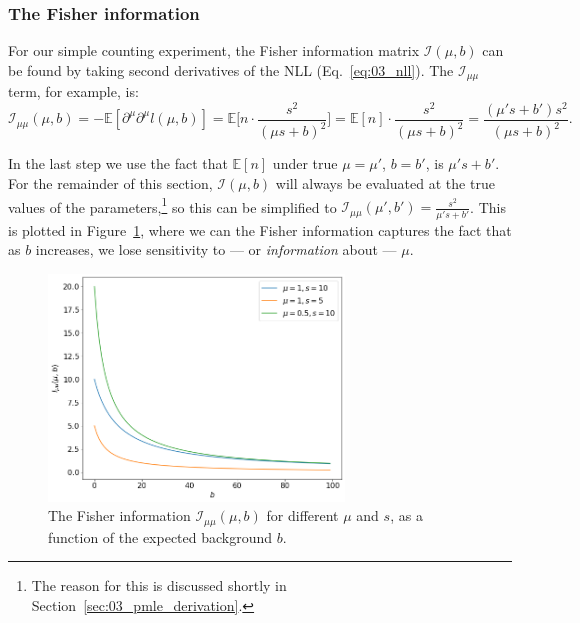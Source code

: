 \subsubsection{The Fisher information}

For our simple counting experiment, the Fisher information matrix $\mathcal I(\mu, b)$ can be found by taking second derivatives of the NLL (Eq.~\ref{eq:03_nll}).
The $\mathcal I_{\mu\mu}$ term, for example, is:
\begin{equation}
    \mathcal I_{\mu\mu}(\mu, b) = - \mathbb E[\partial^\mu\partial^\mu l(\mu, b)] = \mathbb E \bigg[n \cdot \frac{s^2}{(\mu s + b)^2}\bigg] = \mathbb E[n] \cdot \frac{s^2}{(\mu s + b)^2} = \frac{(\mu' s + b') s^2}{(\mu s + b)^2}.
\label{eq:03_fisher}
\end{equation}

In the last step we use the fact that $\mathbb E[n]$ under true $\mu = \mu'$, $b = b'$, is $\mu' s + b'$.
For the remainder of this section, $\mathcal I(\mu, b)$ will always be evaluated at the true values of the parameters,\footnote{The reason for this is discussed shortly in Section~\ref{sec:03_pmle_derivation}.} so this can be simplified to $\mathcal I_{\mu\mu}(\mu', b') = \frac{s^2}{\mu' s + b'}$.
This is plotted in Figure~\ref{fig:03_fisher}, where we can the Fisher information captures the fact that as $b$ increases, we lose sensitivity to --- or \textit{information} about --- $\mu$.

\begin{figure}[htb]
\centering
\includegraphics[width=0.7\textwidth]{figures/03-Stats/05-asymptotic-mle/3.png}
\caption{The Fisher information $\mathcal I_{\mu\mu}(\mu, b)$ for different $\mu$ and $s$, as a function of the expected background $b$.}
\label{fig:03_fisher}
\end{figure}

